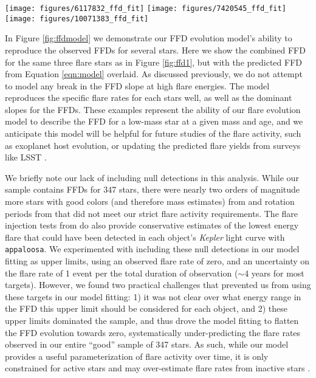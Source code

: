 \documentclass[preprint2]{aastex62}
\newcommand{\Kepler}{\textsl{Kepler}\xspace}
\begin{document}
\begin{figure*}[!t]
\centering
\texttt{[image: figures/6117832\_ffd\_fit]}
\texttt{[image: figures/7420545\_ffd\_fit]}
\texttt{[image: figures/10071383\_ffd\_fit]}
\caption{
Flare frequency distributions as shown from Figure \ref{fig:ffd1} (black line), but with the final flare activity model from Equation \ref{eqn:model} evaluated for each star's mass and age (red line). Note this model was not fit for each star's FFD individually, but instead was fit to our entire sample of 347 stars.}
\label{fig:ffdmodel}
\end{figure*}



In Figure \ref{fig:ffdmodel} we demonstrate our FFD evolution model's ability to reproduce the observed FFDs for several stars. Here we show the combined FFD for the same three flare stars as in Figure \ref{fig:ffd1}, but with the predicted FFD from Equation \ref{eqn:model} overlaid. As discussed previously, we do not attempt to model any break in the FFD slope at high flare energies. The model reproduces the specific flare rates for each stars well, as well as the dominant slopes for the FFDs. These examples represent the ability of our flare evolution model to describe the FFD for a low-mass star at a given mass and age, and we anticipate this model will be helpful for future studies of the flare activity, such as exoplanet host evolution, or updating the predicted flare yields from surveys like LSST \citep{najita2016}.



We briefly note our lack of including null detections in this analysis. While our sample contains FFDs for 347 stars, there were nearly two orders of magnitude more stars with good colors (and therefore mass estimates) from \citet{davenport2016} and rotation periods from \citet{mcquillan2014} that did not meet our strict flare activity requirements. The flare injection tests from \citet{davenport2016} do also provide conservative estimates of the lowest energy flare that could have been detected in each object's \Kepler light curve with {\tt appaloosa}. We experimented with including these null detections in our model fitting as upper limits, using an observed flare rate of zero, and an uncertainty on the flare rate of 1 event per the total duration of observation ($\sim$4 years for most targets). However, we found two practical challenges that prevented us from using these targets in our model fitting: 1) it was not clear over what energy range in the FFD this upper limit should be considered for each object, and 2) these upper limits dominated the sample, and thus drove the model fitting to flatten the FFD evolution towards zero, systematically under-predicting the flare rates observed in our entire ``good'' sample of 347 stars. 
As such, while our model provides a useful parameterization of flare activity over time, it is only constrained for active stars and may over-estimate flare rates from inactive stars \citep[e.g.][]{hawley2014}. 
\end{document}
